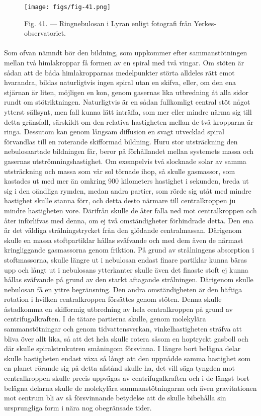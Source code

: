 \documentclass[a4paper, 12pt, oneside, swedish]{article}
\begin{document}
\begin{figure}[H]
\centering
\texttt{[image: figs/fig-41.png]}
\caption{Fig. 41. --- Ringnebulosan i Lyran enligt fotografi från Yerkes-observatoriet.}
\end{figure}
\paragraph{}
Som ofvan nämndt bör den bildning, som uppkommer efter sammanstötningen mellan två himlakroppar få formen av en spiral med två vingar. Om stöten är sådan att de båda himlakropparnas medelpunkter störta alldeles rätt emot hvarandra, bildas naturligtvis ingen spiral utan en skifva, eller, om den ena stjärnan är liten, möjligen en kon, genom gasernas lika utbredning åt alla sidor rundt om stötriktningen. Naturligtvis är en sådan fullkomligt central stöt något ytterst sällsynt, men fall kunna lätt inträffa, som mer eller mindre närma sig till detta gränsfall, särskildt om den relativa hastigheten mellan de två kropparna är ringa. Dessutom kan genom långsam diffusion en svagt utvecklad spiral förvandlas till en roterande skifformad bildning. Huru stor utsträckning den nebulosaartade bildningen får, beror på förhållandet mellan systemets massa och gasernas utströmningshastighet. Om exempelvis två slocknade solar av samma utsträckning och massa som vår sol törnade ihop, så skulle gasmassor, som kastades ut med mer än omkring 900 kilometers hastighet i sekunden, breda ut sig i den oändliga rymden, medan andra partier, som rörde sig utåt med mindre hastighet skulle stanna förr, och detta desto närmare till centralkroppen ju mindre hastigheten vore. Därifrån skulle de åter falla ned mot centralkroppen och åter införlifvas med denna, om ej två omständigheter förhindrade detta. Den ena är det väldiga strålningstrycket från den glödande centralmassan. Därigenom skulle en massa stoftpartiklar hållas sväfvande och med dem även de närmast kringliggande gasmassorna genom friktion. På grund av strålningens absorption i stoftmassorna, skulle längre ut i nebulosan endast finare partiklar kunna bäras upp och långt ut i nebulosans ytterkanter skulle även det finaste stoft ej kunna hållas sväfvande på grund av den starkt aftagande strålningen. Därigenom skulle nebulosan få en yttre begränsning. Den andra omständigheten är den häftiga rotation i hvilken centralkroppen försättes genom stöten. Denna skulle åstadkomma en skifformig utbredning av hela centralkroppen på grund av centrifugalkraften. I de tätare partierna skulle, genom molekylära sammanstötningar och genom tidvattensverkan, vinkelhastigheten sträfva att bliva över allt lika, så att det hela skulle rotera såsom en hoptryckt gasboll och där skulle spiralstrukutren småningom försvinna. I längre bort belägna delar skulle hastigheten endast växa så långt att den uppnådde samma hastighet som en planet rörande sig på detta afstånd skulle ha, det vill säga tyngden mot centralkroppen skulle precis uppvägas av centrifugalkraften och i de längst bort belägna delarna skulle de molekylära sammanstötningarna och även gravitationen mot centrum bli av så försvinnande betydelse att de skulle bibehålla sin ursprungliga form i nära nog obegränsade tider.
\end{document}
